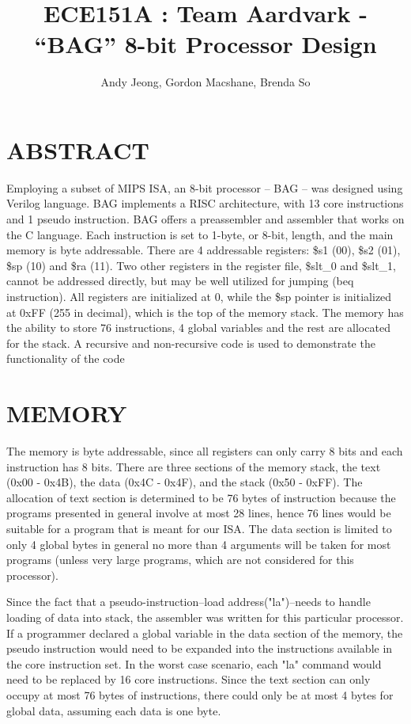 \documentclass[11pt, titlepage]{article}
\author{Andy Jeong, Gordon Macshane, Brenda So}
\title{ECE151A : Team Aardvark - ``BAG'' 8-bit Processor Design}
\date{\parbox{\linewidth}{}}
\begin{document}
\maketitle
\tableofcontents
\newpage
\setcounter{tocdepth}{1}
\section{ABSTRACT}
Employing a subset of MIPS ISA, an 8-bit processor -- BAG -- was designed using Verilog language. BAG implements a RISC architecture, with 13 core instructions and 1 pseudo instruction. BAG offers a preassembler and assembler that works on the C language. Each instruction is set to 1-byte, or 8-bit, length, and the main memory is byte addressable. There are 4 addressable registers: \$s1 (00), \$s2 (01), \$sp (10) and \$ra (11). Two other registers in the register file, \$slt\_0 and \$slt\_1, cannot be addressed directly, but may be well utilized for jumping (beq instruction). All registers are initialized at 0, while the \$sp pointer is initialized at 0xFF (255 in decimal), which is the top of the memory stack. The memory has the ability to store 76 instructions, 4 global variables and the rest are allocated for the stack. A recursive and non-recursive code is used to demonstrate the functionality of the code

\section{MEMORY}
The memory is byte addressable, since all registers can only carry 8 bits and each instruction has 8 bits. There are three sections of the memory stack, the text (0x00 - 0x4B), the data (0x4C - 0x4F), and the stack (0x50 - 0xFF). The allocation of text section is determined to be 76 bytes of instruction because the programs presented in general involve at most 28 lines, hence 76 lines would be suitable for a program that is meant for our ISA. The data section is limited to only 4 global bytes in general no more than 4 arguments will be taken for most programs (unless very large programs, which are not considered for this processor). 

\par Since the fact that a pseudo-instruction--load address("la")--needs to handle loading of data into stack, the assembler was written for this particular processor. If a programmer declared a global variable in the data section of the memory, the pseudo instruction would need to be expanded into the instructions available in the core instruction set. In the worst case scenario, each "la" command would need to be replaced by 16 core instructions. Since the text section can only occupy at most 76 bytes of instructions, there could only be at most 4 bytes for global data, assuming each data is one byte. 
\end{document}
